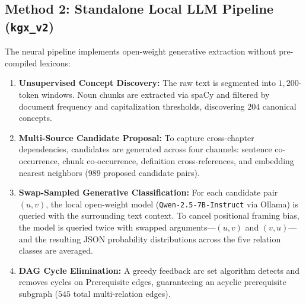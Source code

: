 \subsection{Method 2: Standalone Local LLM Pipeline (\texttt{kgx\_v2})}
The neural pipeline implements open-weight generative extraction without pre-compiled lexicons:
\begin{enumerate}[leftmargin=*]
    \item \textbf{Unsupervised Concept Discovery:} The raw text is segmented into $1{,}200$-token windows. Noun chunks are extracted via spaCy and filtered by document frequency and capitalization thresholds, discovering $204$ canonical concepts.
    \item \textbf{Multi-Source Candidate Proposal:} To capture cross-chapter dependencies, candidates are generated across four channels: sentence co-occurrence, chunk co-occurrence, definition cross-references, and embedding nearest neighbors ($989$ proposed candidate pairs).
    \item \textbf{Swap-Sampled Generative Classification:} For each candidate pair $(u, v)$, the local open-weight model (\texttt{Qwen-2.5-7B-Instruct} via Ollama) is queried with the surrounding text context. To cancel positional framing bias, the model is queried twice with swapped arguments—$(u, v)$ and $(v, u)$—and the resulting JSON probability distributions across the five relation classes are averaged.
    \item \textbf{DAG Cycle Elimination:} A greedy feedback arc set algorithm detects and removes cycles on Prerequisite edges, guaranteeing an acyclic prerequisite subgraph ($545$ total multi-relation edges).
\end{enumerate}

